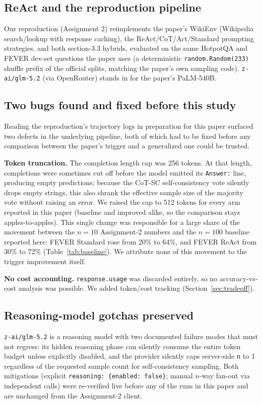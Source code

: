 \subsection{ReAct and the reproduction pipeline}
Our reproduction (Assignment 2) reimplements the paper's WikiEnv
(Wikipedia search/lookup with response caching), the ReAct/CoT/Act/Standard
prompting strategies, and both section-3.3 hybrids, evaluated on the same
HotpotQA and FEVER dev-set questions the paper uses (a deterministic
\texttt{random.Random(233)} shuffle prefix of the official splits, matching
the paper's own sampling code). \texttt{z-ai/glm-5.2} (via OpenRouter)
stands in for the paper's PaLM-540B.

\subsection{Two bugs found and fixed before this study}
Reading the reproduction's trajectory logs in preparation for this paper
surfaced two defects in the underlying pipeline, both of which had to be
fixed before any comparison between the paper's trigger and a generalized
one could be trusted.

\textbf{Token truncation.} The completion length cap was 256 tokens. At
that length, completions were sometimes cut off before the model emitted
its \texttt{Answer:} line, producing empty predictions; because the CoT-SC
self-consistency vote silently drops empty strings, this also shrank the
effective sample size of the majority vote without raising an error. We
raised the cap to 512 tokens for every arm reported in this paper
(baseline and improved alike, so the comparison stays apples-to-apples).
This single change was responsible for a large share of the movement
between the $n{=}10$ Assignment-2 numbers and the $n{=}100$ baseline
reported here: FEVER Standard rose from 20\% to 64\%, and FEVER ReAct from
30\% to 72\% (Table~\ref{tab:baseline}). We attribute none of this movement
to the trigger improvement itself.

\textbf{No cost accounting.} \texttt{response.usage} was discarded
entirely, so no accuracy-vs-cost analysis was possible. We added
token/cost tracking (Section~\ref{sec:tradeoff}).

\subsection{Reasoning-model gotchas preserved}
\texttt{z-ai/glm-5.2} is a reasoning model with two documented failure
modes that must not regress: its hidden reasoning phase can silently
consume the entire token budget unless explicitly disabled, and the
provider silently caps server-side \texttt{n} to 1 regardless of the
requested sample count for self-consistency sampling. Both mitigations
(explicit \texttt{reasoning: \{enabled: false\}}; manual $n$-way
fan-out via independent calls) were re-verified live before any of the
runs in this paper and are unchanged from the Assignment-2 client.
